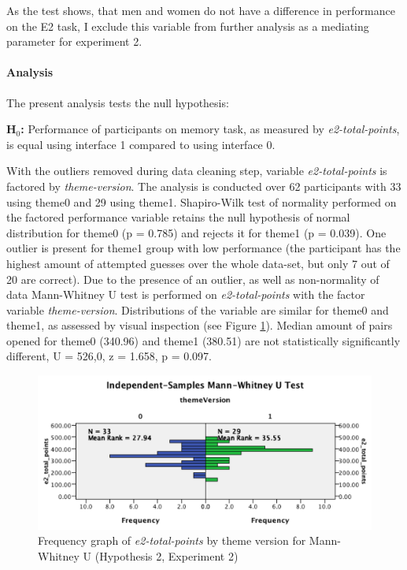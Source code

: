 	As the test shows, that men and women do not have a difference in performance on the E2 task, I exclude this variable from further analysis as a mediating parameter for experiment 2.
	
	\paragraph{Analysis}
	
	The present analysis tests the null hypothesis:
	
	\textbf{H$_{0}$:} Performance of participants on memory task, as measured by \textit{e2-total-points}, is equal using interface 1 compared to using interface 0.
	
	With the outliers removed during data cleaning step, variable \textit{e2-total-points} is factored by \textit{theme-version}. The analysis is conducted over 62 participants with 33 using theme0 and 29 using theme1.
	Shapiro-Wilk test of normality performed on the factored performance variable retains the null hypothesis of normal distribution for theme0 (p = 0.785) and rejects it for theme1 (p = 0.039).
	One outlier is present for theme1 group with low performance (the participant has the highest amount of attempted guesses over the whole data-set, but only 7 out of 20 are correct).
	Due to the presence of an outlier, as well as non-normality of data Mann-Whitney U test is performed on \textit{e2-total-points} with the factor variable \textit{theme-version}. Distributions of the variable are similar for theme0 and theme1, as assessed by visual inspection (see Figure \ref{fig:h2e2-mannwhitneyu}). Median amount of pairs opened for theme0 (340.96) and theme1 (380.51) are not statistically significantly different, U = 526,0, z = 1.658, p = 0.097.
	
	\begin{figure}[h]
		\centering
		\includegraphics[width=0.8\linewidth]{graphics/H2E2-MannWhitneyU}
		\caption{Frequency graph of \textit{e2-total-points} by theme version for Mann-Whitney U (Hypothesis 2, Experiment 2)}
		\label{fig:h2e2-mannwhitneyu}
	\end{figure}
	
